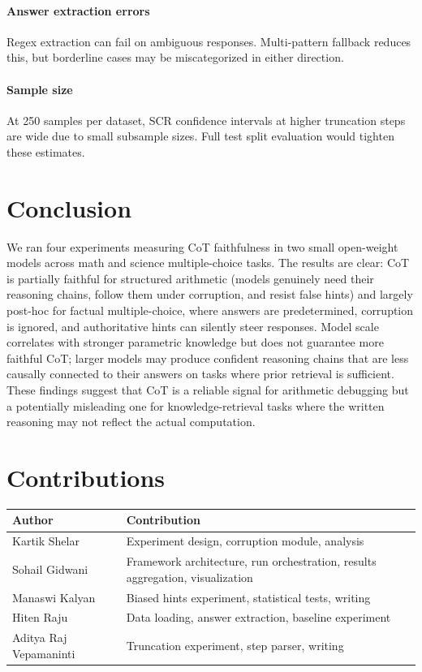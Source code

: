 \documentclass[11pt,twocolumn]{article}
\begin{document}
\paragraph{Answer extraction errors}
Regex extraction can fail on ambiguous responses. Multi-pattern fallback
reduces this, but borderline cases may be miscategorized in either direction.

\paragraph{Sample size}
At 250 samples per dataset, SCR confidence intervals at higher truncation
steps are wide due to small subsample sizes. Full test split evaluation would
tighten these estimates.


\section{Conclusion}

We ran four experiments measuring CoT faithfulness in two small open-weight
models across math and science multiple-choice tasks. The results are clear:
CoT is partially faithful for structured arithmetic (models genuinely need
their reasoning chains, follow them under corruption, and resist false
hints) and largely post-hoc for factual multiple-choice, where answers are
predetermined, corruption is ignored, and authoritative hints can silently
steer responses. Model scale correlates with stronger parametric knowledge
but does not guarantee more faithful CoT; larger models may produce confident
reasoning chains that are less causally connected to their answers on tasks
where prior retrieval is sufficient. These findings suggest that CoT is a
reliable signal for arithmetic debugging but a potentially misleading one for
knowledge-retrieval tasks where the written reasoning may not reflect the
actual computation.


\section*{Contributions}

\begin{table}[h!]
\centering
\small
\begin{tabular}{lp{4.5cm}}
\toprule
\textbf{Author} & \textbf{Contribution} \\
\midrule
Kartik Shelar      & Experiment design, corruption module, analysis \\
Sohail Gidwani     & Framework architecture, run orchestration, results aggregation, visualization \\
Manaswi Kalyan         & Biased hints experiment, statistical tests, writing \\
Hiten Raju         & Data loading, answer extraction, baseline experiment \\
Aditya Raj Vepamaninti & Truncation experiment, step parser, writing \\
\bottomrule
\end{tabular}
\end{table}



\end{document}
